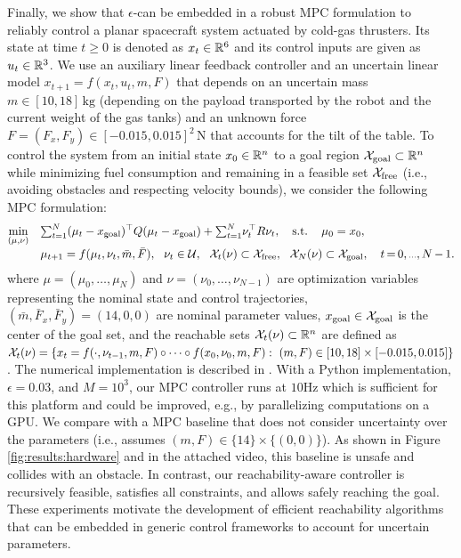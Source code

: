 \documentclass[12pt]{l4dc2022} %
\begin{document}
% 
Finally, we show that $\epsilon$-\randup can be embedded in a robust MPC formulation to reliably control a planar spacecraft system actuated by cold-gas thrusters. Its state at time $t\geq 0$ is denoted as 
% 
$x_t\in\mathbb{R}^6$ and its control inputs are given as $u_t\in\mathbb{R}^3$. 
We use an auxiliary linear feedback controller \citep{LewEtAl2022} and an uncertain linear model $x_{t+1}=f(x_t,u_t,m,F)$ that depends on an uncertain mass $m\in[10,18] \,\textrm{kg}$ (depending on the payload transported by the robot and the current weight of the gas tanks) and an unknown force $F=(F_x,F_y)\in[-0.015,0.015]^2 \,\textrm{N}$ that accounts for the tilt of the table. 
% 
To control the system from an initial state $x_0\in\mathbb{R}^n$ to a goal region $\mathcal{X}_{\text{goal}}\subset\mathbb{R}^n$ while 
minimizing fuel consumption and 
remaining in a feasible set $\mathcal{X}_{\text{free}}$ (i.e., avoiding obstacles and respecting velocity bounds), we consider the following MPC formulation:
\begin{subequations}
\label{eq:full_problem}
\begin{align}
\mathop{\text{min}}_{(\mu,\nu)}
\quad &
\scalebox{0.95}{$\sum_{t=1}^{N}$} (\mu_t-x_{\textrm{goal}})^\top Q(\mu_t-x_{\textrm{goal}})
+
\scalebox{0.95}{$\sum_{t=1}^{N}$}
\nu_t^\top R \nu_t,
\quad 
\textrm{s.t.}
\quad\,
\mu_0=x_0, 
\label{eq:cost:measure}
\\[-1mm]
\textrm{ }
\quad
& 
\mu_{t+1} = f(\mu_t,\nu_t, \bar{m}, \bar{F}),
\ \ 
\nu_t\in\U, 
\ \  
\X_t(\nu) \subset \Xsafe,
\ \ 
\X_N(\nu) \subset \Xgoal,
\ \  
\ {\tiny t\,{=}\,0, \mydots,N\,{-}\,1}
.
\label{eq:robust_constraints_orig}
\end{align}
\end{subequations} 
where $\mu=(\mu_0,\dots,\mu_N)$ %
and $\nu=(\nu_0,\dots,\nu_{N-1})$ %
are optimization variables representing the nominal state and control trajectories, $(\bar{m},\bar{F}_x, \bar{F}_y)=(14,0,0)$ are nominal parameter values, $x_{\textrm{goal}}\in\mathcal{X}_{\text{goal}}$ is the center of the goal set, and the reachable sets $\mathcal{X}_t(\nu)\subset\mathbb{R}^n$ are defined as
% 
$\X_t(\nu) = %
\{
x_t=f(\cdot,\nu_{t-1},m,F)
\circ\dots\circ
f(x_0,\nu_0,m,F):
\
(m,F)\in[10,18]\times[-0.015,0.015]
% 
\}$.
% 
% 
The numerical implementation %
is described in \citep{LewPavone2020}. 
% 
% 
With a Python implementation, $\epsilon=0.03$, and $M=10^3$, our MPC controller runs at $10$\textrm{Hz} %
which is sufficient for this platform and could be improved, e.g., by parallelizing computations on a GPU. 
We compare with a MPC baseline that does not consider uncertainty over the parameters (i.e., assumes $(m,F)\in\{14\}{\times}\{(0,0)\}$).  As shown in Figure \ref{fig:results:hardware} and in the attached video, this baseline is unsafe and collides with an obstacle. 
% 
% 
% 
In contrast, our reachability-aware controller is recursively feasible, satisfies all constraints, and allows safely reaching the goal. 
These experiments motivate the development of efficient reachability algorithms that can be embedded in generic control frameworks to account for uncertain parameters. %
\end{document}
